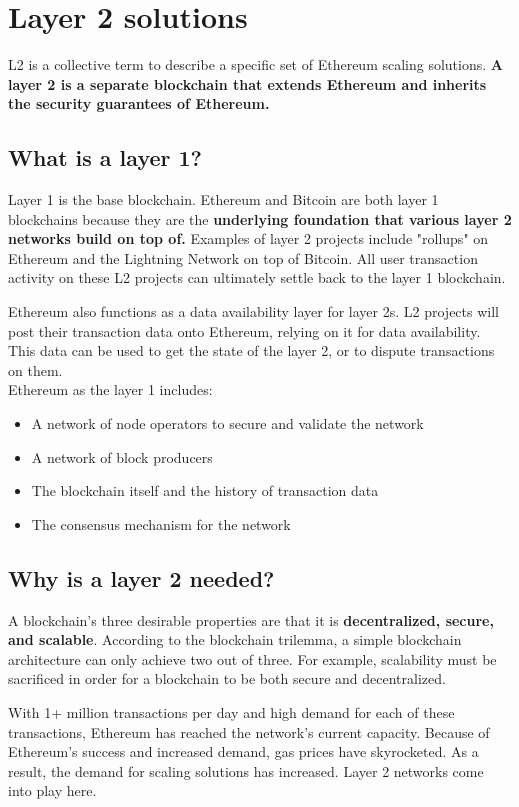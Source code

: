 \documentclass[MSE,Master,english]{twbook}%
\begin{document}
\section{Layer 2 solutions\label{layer2}}
\ac{L2}\cite{l2} is a collective term to describe a specific set of Ethereum scaling solutions. \textbf{A layer 2 is a separate blockchain that extends Ethereum and inherits the security guarantees of Ethereum.}

\subsection{What is a layer 1?}
Layer 1 is the base blockchain. Ethereum and Bitcoin are both layer 1 blockchains because they are the \textbf{underlying foundation that various layer 2 networks build on top of.} Examples of layer 2 projects include "rollups" on Ethereum and the Lightning Network on top of Bitcoin. All user transaction activity on these \ac{L2} projects can ultimately settle back to the layer 1 blockchain.

Ethereum also functions as a data availability layer for layer 2s. \ac{L2} projects will post their transaction data onto Ethereum, relying on it for data availability. This data can be used to get the state of the layer 2, or to dispute transactions on them. \\

Ethereum as the layer 1 includes:

\begin{itemize}
  \item A network of node operators to secure and validate the network
  \item A network of block producers
  \item The blockchain itself and the history of transaction data
  \item The consensus mechanism for the network
\end{itemize}

\subsection{Why is a layer 2 needed?}
A blockchain's three desirable properties are that it is \textbf{decentralized, secure, and scalable}. According to the blockchain trilemma, a simple blockchain architecture can only achieve two out of three. For example, scalability must be sacrificed in order for a blockchain to be both secure and decentralized.

With 1+ million transactions per day and high demand for each of these transactions, Ethereum has reached the network's current capacity. Because of Ethereum's success and increased demand, gas prices have skyrocketed. As a result, the demand for scaling solutions has increased. Layer 2 networks come into play here. \\
\end{document}
